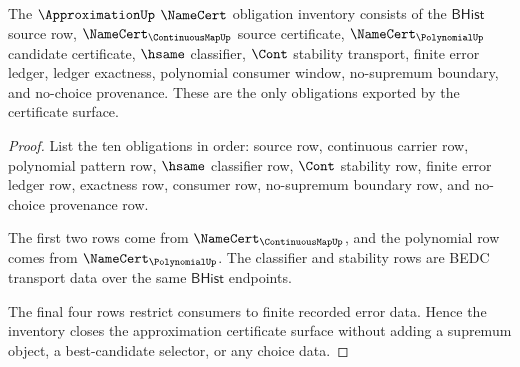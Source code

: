 \begin{theorem}
\label{thm:approximation-namecert-obligation-inventory}
The $\ApproximationUp$ $\NameCert$ obligation inventory consists of the
$\mathsf{BHist}$ source row, $\NameCert_{\ContinuousMapUp}$ source certificate,
$\NameCert_{\PolynomialUp}$ candidate certificate, $\hsame$ classifier,
$\Cont$ stability transport, finite error ledger, ledger exactness, polynomial
consumer window, no-supremum boundary, and no-choice provenance. These are the
only obligations exported by the certificate surface.
\end{theorem}
\begin{proof}
List the ten obligations in order: source row, continuous carrier row,
polynomial pattern row, $\hsame$ classifier row, $\Cont$ stability row, finite
error ledger row, exactness row, consumer row, no-supremum boundary row, and
no-choice provenance row.

The first two rows come from $\NameCert_{\ContinuousMapUp}$, and the polynomial
row comes from $\NameCert_{\PolynomialUp}$. The classifier and stability rows
are BEDC transport data over the same $\mathsf{BHist}$ endpoints.

The final four rows restrict consumers to finite recorded error data. Hence the
inventory closes the approximation certificate surface without adding a
supremum object, a best-candidate selector, or any choice data.
\end{proof}

